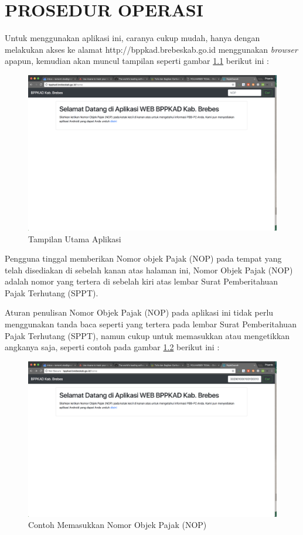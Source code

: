\chapter{PROSEDUR OPERASI}

Untuk menggunakan aplikasi ini, caranya cukup mudah, hanya dengan melakukan akses ke alamat http://bppkad.brebeskab.go.id menggunakan \textit{browser} apapun, kemudian akan muncul tampilan seperti gambar \ref{fig:main-fe} berikut ini :

\begin{figure}[H]
	\centering
	\includegraphics[width=1\textwidth]{./resources/main-fe}
	\caption{Tampilan Utama Aplikasi}
	\label{fig:main-fe}
\end{figure}

Pengguna tinggal memberikan Nomor objek Pajak (NOP) pada tempat yang telah disediakan di sebelah kanan atas halaman ini, Nomor Objek Pajak (NOP) adalah nomor yang tertera di sebelah kiri atas lembar Surat Pemberitahuan Pajak Terhutang (SPPT).

Aturan penulisan Nomor Objek Pajak (NOP) pada aplikasi ini tidak perlu menggunakan tanda baca seperti yang tertera pada lembar Surat Pemberitahuan Pajak Terhutang (SPPT), namun cukup untuk memasukkan atau mengetikkan angkanya saja, seperti contoh pada gambar \ref{fig:contoh-nop} berikut ini :

\begin{figure}[H]
	\centering
	\includegraphics[width=1\textwidth]{./resources/contoh-input-nop}
	\caption{Contoh Memasukkan Nomor Objek Pajak (NOP)}
	\label{fig:contoh-nop}
\end{figure}

